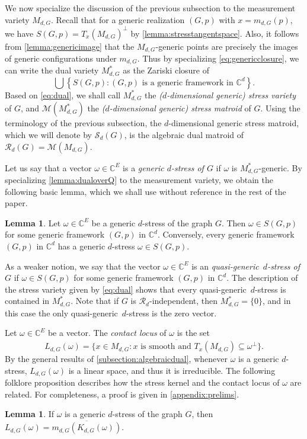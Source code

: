 \documentclass[11pt,a4paper,dvipsnames]{scrartcl}
\theoremstyle{definition}
\newtheorem{lemma}[theorem]{Lemma}
\newcommand{\CC}{\mathbb{C}}
\newcommand{\algmat}[1]{\mathcal{M}(#1)}
\newcommand{\stressmatroid}[2]{\mathcal{S}_{#1}(#2)}
\newcommand{\stresskernel}[2]{K_{{#1},{#2}}}
\newcommand{\contactlocus}[2]{L_{#1,#2}}
\newcommand{\quasigen}{quasi-generic}
\begin{document}
We now specialize the discussion of the previous subsection to the measurement variety $M_{d,G}$.
Recall that for a generic realization $(G,p)$ with $x = m_{d,G}(p)$, we have $S(G,p) = {T_x(M_{d,G})}^\perp$ by \cref{lemma:stresstangentspace}. Also, it follows from \cref{lemma:genericimage} that the $M_{d,G}$-generic points are precisely the images of generic configurations under $m_{d,G}$. Thus by specializing \cref{eq:genericclosure}, we can write the dual variety $M_{d,G}^*$ as the Zariski closure of
\begin{equation}\label{eq:dual}
    \bigcup \left\{S(G,p) : (G,p) \text{ is a generic framework in } \CC^d \right\}.
\end{equation}
Based on \cref{eq:dual}, we shall call $M_{d,G}^*$ the \emph{($d$-dimensional generic) stress variety} of $G$, and $\algmat{M_{d,G}^*}$ the \emph{($d$-dimensional generic) stress matroid} of $G$. Using the terminology of the previous subsection, the $d$-dimensional generic stress matroid, which we will denote by $\stressmatroid{d}{G}$, is the algebraic dual matroid of $\mathcal{R}_d(G) = \algmat{M_{d,G}}$.

Let us say that a vector $\omega \in \CC^E$ is a \emph{generic $d$-stress of $G$} if $\omega$ is $M_{d,G}^*$-generic. By specializing \cref{lemma:dualoverQ} to the measurement variety, we obtain the following basic lemma, which we shall use without reference in the rest of the paper.
\begin{lemma}
    Let $\omega \in \CC^E$ be a generic $d$-stress of the graph $G$. Then $\omega \in S(G,p)$ for some generic framework $(G,p)$ in $\CC^d$. Conversely, every generic framework $(G,p)$ in $\CC^d$ has a generic $d$-stress $\omega \in S(G,p)$.
\end{lemma}
As a weaker notion, we say that the vector $\omega \in \CC^E$ is an \emph{\quasigen\ $d$-stress of $G$} if $\omega \in S(G,p)$ for some generic framework $(G,p)$ in $\CC^d$. 
The description of the stress variety given by \cref{eq:dual} shows that every \quasigen\ $d$-stress is contained in $M_{d,G}^*$. Note that if $G$ is $\mathcal{R}_d$-independent, then $M_{d,G}^* = \{0\}$, and in this case the only \quasigen\ $d$-stress is the zero vector. 

Let $\omega \in \CC^E$ be a vector. The \emph{contact locus} of $\omega$ is the set
\[\contactlocus{d}{G}(\omega) = \overline{\{x \in M_{d,G}: x \text{ is smooth and } T_x(M_{d,G}) \subseteq \omega^\perp\}}.\] By the general results of \cref{subsection:algebraicdual}, whenever $\omega$ is a generic $d$-stress, $\contactlocus{d}{G}(\omega)$ is a linear space, and thus it is irreducible. The following folklore proposition describes how the stress kernel and the contact locus of $\omega$ are related. For completeness, a proof is given in \cref{appendix:prelims}.
\begin{lemma}\label{lemma:contactlocusstresskernel}
    If $\omega$ is a generic $d$-stress of the graph $G$, then $\contactlocus{d}{G}(\omega) = \overline{m_{d,G}(\stresskernel{d}{G}(\omega))}$.
\end{lemma}
\end{document}
